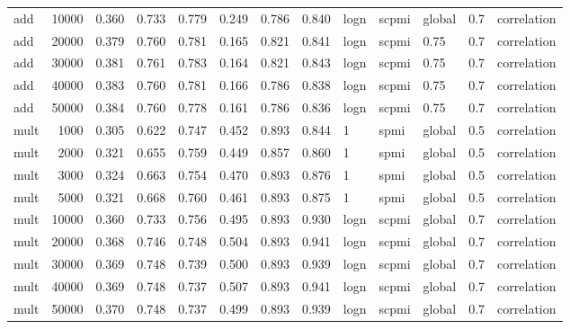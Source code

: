 \begin{tabular}{lrrrrrrrlllll}
     add &           10000 &      0.360 &  0.733 &  0.779 &  0.249 &      0.786 &      0.840 &  logn &  scpmi &  global &  0.7 &    correlation \\
     add &           20000 &      0.379 &  0.760 &  0.781 &  0.165 &      0.821 &      0.841 &  logn &  scpmi &    0.75 &  0.7 &    correlation \\
     add &           30000 &      0.381 &  0.761 &  0.783 &  0.164 &      0.821 &      0.843 &  logn &  scpmi &    0.75 &  0.7 &    correlation \\
     add &           40000 &      0.383 &  0.760 &  0.781 &  0.166 &      0.786 &      0.838 &  logn &  scpmi &    0.75 &  0.7 &    correlation \\
     add &           50000 &      0.384 &  0.760 &  0.778 &  0.161 &      0.786 &      0.836 &  logn &  scpmi &    0.75 &  0.7 &    correlation \\
    mult &            1000 &      0.305 &  0.622 &  0.747 &  0.452 &      0.893 &      0.844 &     1 &   spmi &  global &  0.5 &    correlation \\
    mult &            2000 &      0.321 &  0.655 &  0.759 &  0.449 &      0.857 &      0.860 &     1 &   spmi &  global &  0.5 &    correlation \\
    mult &            3000 &      0.324 &  0.663 &  0.754 &  0.470 &      0.893 &      0.876 &     1 &   spmi &  global &  0.5 &    correlation \\
    mult &            5000 &      0.321 &  0.668 &  0.760 &  0.461 &      0.893 &      0.875 &     1 &   spmi &  global &  0.5 &    correlation \\
    mult &           10000 &      0.360 &  0.733 &  0.756 &  0.495 &      0.893 &      0.930 &  logn &  scpmi &  global &  0.7 &    correlation \\
    mult &           20000 &      0.368 &  0.746 &  0.748 &  0.504 &      0.893 &      0.941 &  logn &  scpmi &  global &  0.7 &    correlation \\
    mult &           30000 &      0.369 &  0.748 &  0.739 &  0.500 &      0.893 &      0.939 &  logn &  scpmi &  global &  0.7 &    correlation \\
    mult &           40000 &      0.369 &  0.748 &  0.737 &  0.507 &      0.893 &      0.941 &  logn &  scpmi &  global &  0.7 &    correlation \\
    mult &           50000 &      0.370 &  0.748 &  0.737 &  0.499 &      0.893 &      0.939 &  logn &  scpmi &  global &  0.7 &    correlation \\

\end{tabular}
